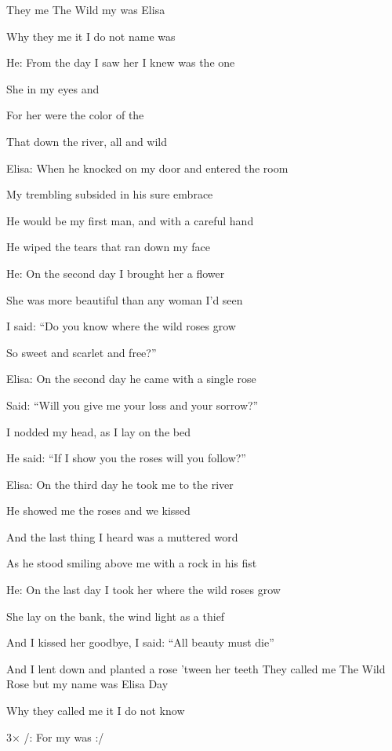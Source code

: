 
\zr
They  me The Wild   my  was Elisa 

Why they  me it I do not   name was  
\kr

He:
\zs
From the  day I saw her I knew  was the one 

She  in my eyes and 

For her  were the color of the  

That  down the river, all  and wild
\ks

Elisa:
\zs
When he knocked on my door and entered the room

My trembling subsided in his sure embrace

He would be my first man, and with a careful hand

He wiped the tears that ran down my face
\ks

\zr \kr

He:
\zs
On the second day I brought her a flower

She was more beautiful than any woman I'd seen

I said: ``Do you know where the wild roses grow

So sweet and scarlet and free?''
\ks


Elisa:
\zs
On the second day he came with a single rose

Said: ``Will you give me your loss and your sorrow?''

I nodded my head, as I lay on the bed

He said: ``If I show you the roses will you follow?''
\ks

\zr \kr

Elisa:
\zs
On the third day he took me to the river

He showed me the roses and we kissed

And the last thing I heard was a muttered word

As he stood smiling above me with a rock in his fist 
\ks

He:
\zs
On the last day I took her where the wild roses grow

She lay on the bank, the wind light as a thief

And I kissed her goodbye, I said: ``All beauty must die''

And I lent down and planted a rose 'tween her teeth 
\ks
\zr
They called me The Wild Rose but my name was Elisa Day

Why they called me it I do not know

3× /: For my  was   :/
\kr

\kp
